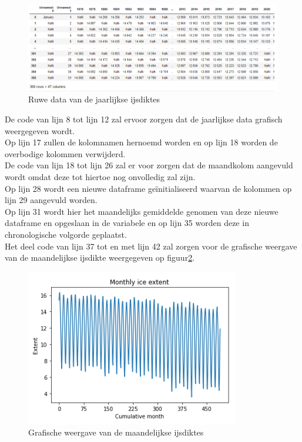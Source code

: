 \begin{figure}
    \centering
    \caption{Ruwe data van de jaarlijkse ijsdiktes}
    \label{fig:icedataraw}
    \includegraphics[width=1\linewidth]{ice_data_rawpng}
\end{figure}

De code van lijn 8 tot lijn 12 zal ervoor zorgen dat de jaarlijkse data grafisch weergegeven wordt. \\
Op lijn 17 zullen de kolomnamen hernoemd worden en op lijn 18 worden de overbodige kolommen verwijderd. \\

De code van lijn 18 tot lijn 26 zal er voor zorgen dat de maandkolom aangevuld wordt omdat deze tot hiertoe nog onvolledig zal zijn. \\
Op lijn 28 wordt een nieuwe dataframe ge\"{i}nitialiseerd waarvan de kolommen op lijn 29 aangevuld worden. \\
Op lijn 31 wordt hier het maandelijks gemiddelde genomen van deze nieuwe dataframe en opgeslaan in de variabele en op lijn 35 worden deze in chronologische volgorde geplaatst.\\

Het deel code van lijn 37 tot en met lijn 42 zal zorgen voor de grafische weergave van de maandelijkse ijsdikte weergegeven op figuur\ref{fig:iceextentmonthly}. \\

\begin{figure}
    \centering
    \caption{Grafische weergave van de maandelijkse ijsdiktes}
    \label{fig:iceextentmonthly}
    \includegraphics[width=0.7\linewidth]{ice_extent_monthly}
\end{figure}

